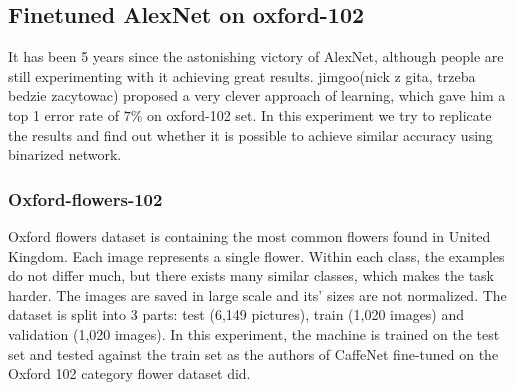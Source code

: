 \documentclass[licencjacka]{pracamgr}
\begin{document}
 	\subsection{Finetuned AlexNet on oxford-102}
 	It has been 5 years since the astonishing victory of AlexNet, although people are still experimenting with it achieving great results. jimgoo(nick z gita, trzeba bedzie zacytowac) proposed a very clever approach of learning, which gave him a top 1 error rate of $7\%$ on oxford-102 set. In this experiment we try to replicate the results and find out whether it is possible to achieve similar accuracy using binarized network. 
 		\subsubsection{Oxford-flowers-102}
 			Oxford flowers dataset is containing the most common flowers found in United Kingdom. Each image represents a single flower. Within each class, the examples do not differ much, but there exists many similar classes, which makes the task harder. The images are saved in large scale and its’ sizes are not normalized. The dataset is split into 3 parts: test (6,149 pictures), train (1,020 images) and validation (1,020 images). In this experiment, the machine is trained on the test set and tested against the train set as the authors of CaffeNet fine-tuned on the Oxford 102 category flower dataset did.
\end{document}
